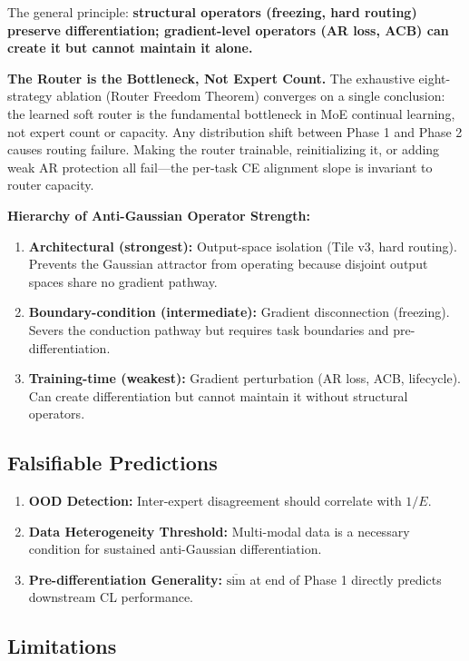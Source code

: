 \documentclass[twoside]{article}
\theoremstyle{definition}
\begin{document}
The general principle: \textbf{structural operators (freezing, hard routing) preserve differentiation; gradient-level operators (AR loss, ACB) can create it but cannot maintain it alone.}

\textbf{The Router is the Bottleneck, Not Expert Count.} The exhaustive eight-strategy ablation (Router Freedom Theorem) converges on a single conclusion: the learned soft router is the fundamental bottleneck in MoE continual learning, not expert count or capacity. Any distribution shift between Phase 1 and Phase 2 causes routing failure. Making the router trainable, reinitializing it, or adding weak AR protection all fail---the per-task CE alignment slope is invariant to router capacity.

\textbf{Hierarchy of Anti-Gaussian Operator Strength:}

\begin{enumerate}
    \item \textbf{Architectural (strongest):} Output-space isolation (Tile v3, hard routing). Prevents the Gaussian attractor from operating because disjoint output spaces share no gradient pathway.
    \item \textbf{Boundary-condition (intermediate):} Gradient disconnection (freezing). Severs the conduction pathway but requires task boundaries and pre-differentiation.
    \item \textbf{Training-time (weakest):} Gradient perturbation (AR loss, ACB, lifecycle). Can create differentiation but cannot maintain it without structural operators.
\end{enumerate}

\subsection{Falsifiable Predictions}

\begin{enumerate}
    \item \textbf{OOD Detection:} Inter-expert disagreement should correlate with $1/E$.
    \item \textbf{Data Heterogeneity Threshold:} Multi-modal data is a necessary condition for sustained anti-Gaussian differentiation.
    \item \textbf{Pre-differentiation Generality:} $\overline{\text{sim}}$ at end of Phase 1 directly predicts downstream CL performance.
\end{enumerate}

\subsection{Limitations}
\end{document}
